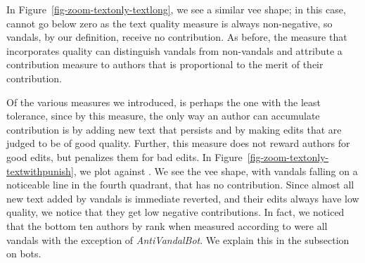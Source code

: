 In Figure~\ref{fig-zoom-textonly-textlong},
we see a similar vee shape; in this case, \textlong
cannot go below zero as the text quality measure is always
non-negative, so vandals, by our definition, receive no
contribution.
As before, the measure that incorporates quality can
distinguish vandals from non-vandals and attribute a contribution
measure to authors that is proportional to the merit of their
contribution.

Of the various measures we introduced, \punish is perhaps the
one with the least tolerance, since by this measure, the only way
an author can accumulate contribution is by adding new
text that persists and by making edits that are judged to be
of good quality.
Further, this measure does not reward authors for good edits,
but penalizes them for bad edits.
In Figure~\ref{fig-zoom-textonly-textwithpunish}, we plot \textonly
against \punish.
We see the vee shape, with vandals falling on a noticeable line in
the fourth quadrant, that has no \textonly contribution.
Since almost all new text added by vandals is immediate reverted,
and their edits always have low quality, we notice that they get
low negative \punish contributions.
In fact, we noticed that the bottom ten authors by rank when
measured according to \punish were all vandals with the exception
of \textit{AntiVandalBot}.
We explain this in the subsection on bots.

